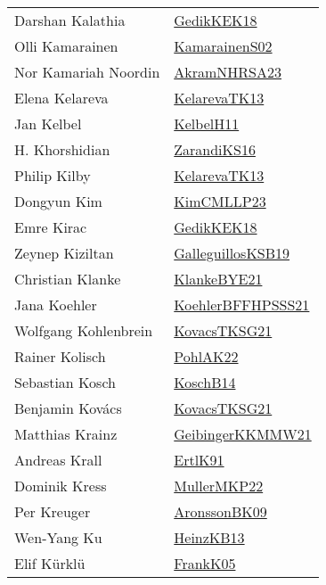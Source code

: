 {\begin{longtable}{p{4cm}p{20cm}}
Darshan Kalathia & \href{articles/GedikKEK18.pdf}{GedikKEK18}\cite{GedikKEK18} \\
Olli Kamarainen & \href{papers/KamarainenS02.pdf}{KamarainenS02}\cite{KamarainenS02} \\
Nor Kamariah Noordin & \href{articles/AkramNHRSA23.pdf}{AkramNHRSA23}\cite{AkramNHRSA23} \\
Elena Kelareva & \href{papers/KelarevaTK13.pdf}{KelarevaTK13}\cite{KelarevaTK13} \\
Jan Kelbel & \href{articles/KelbelH11.pdf}{KelbelH11}\cite{KelbelH11} \\
H. Khorshidian & \href{articles/ZarandiKS16.pdf}{ZarandiKS16}\cite{ZarandiKS16} \\
Philip Kilby & \href{papers/KelarevaTK13.pdf}{KelarevaTK13}\cite{KelarevaTK13} \\
Dongyun Kim & \href{papers/KimCMLLP23.pdf}{KimCMLLP23}\cite{KimCMLLP23} \\
Emre Kirac & \href{articles/GedikKEK18.pdf}{GedikKEK18}\cite{GedikKEK18} \\
Zeynep Kiziltan & \href{papers/GalleguillosKSB19.pdf}{GalleguillosKSB19}\cite{GalleguillosKSB19} \\
Christian Klanke & \href{papers/KlankeBYE21.pdf}{KlankeBYE21}\cite{KlankeBYE21} \\
Jana Koehler & \href{articles/KoehlerBFFHPSSS21.pdf}{KoehlerBFFHPSSS21}\cite{KoehlerBFFHPSSS21} \\
Wolfgang Kohlenbrein & \href{papers/KovacsTKSG21.pdf}{KovacsTKSG21}\cite{KovacsTKSG21} \\
Rainer Kolisch & \href{articles/PohlAK22.pdf}{PohlAK22}\cite{PohlAK22} \\
Sebastian Kosch & \href{papers/KoschB14.pdf}{KoschB14}\cite{KoschB14} \\
Benjamin Kov{\'{a}}cs & \href{papers/KovacsTKSG21.pdf}{KovacsTKSG21}\cite{KovacsTKSG21} \\
Matthias Krainz & \href{papers/GeibingerKKMMW21.pdf}{GeibingerKKMMW21}\cite{GeibingerKKMMW21} \\
Andreas Krall & \href{papers/ErtlK91.pdf}{ErtlK91}\cite{ErtlK91} \\
Dominik Kress & \href{articles/MullerMKP22.pdf}{MullerMKP22}\cite{MullerMKP22} \\
Per Kreuger & \href{papers/AronssonBK09.pdf}{AronssonBK09}\cite{AronssonBK09} \\
Wen{-}Yang Ku & \href{papers/HeinzKB13.pdf}{HeinzKB13}\cite{HeinzKB13} \\
Elif K{\"{u}}rkl{\"{u}} & \href{papers/FrankK05.pdf}{FrankK05}\cite{FrankK05} \\

\end{longtable}}
